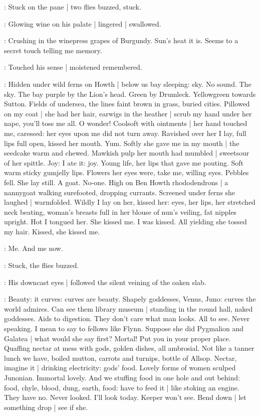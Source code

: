 :
Stuck on the pane |
two flies buzzed,
stuck.

:
Glowing wine on his palate |
lingered |
swallowed.

\BloomInt:
Crushing in the winepress grapes of Burgundy.
Sun's heat it is.
Seems to a secret touch telling me memory.

:
Touched his sense |
moistened remembered.

\BloomInt:
Hidden under wild ferns on Howth |
below us bay sleeping:
sky.
No sound.
The sky.
The bay purple by the Lion's head.
Green by Drumleck.
Yellowgreen towards Sutton.
Fields of undersea,
the lines faint brown in grass,
buried cities.
Pillowed on my coat |
she had her hair,
earwigs in the heather |
scrub my hand under her nape,
you'll toss me all.
O wonder!
Coolsoft with ointments |
her hand touched me,
caressed:
her eyes upon me did not turn away.
Ravished over her I lay,
full lips full open,
kissed her mouth.
Yum.
Softly she gave me in my mouth |
the seedcake warm and chewed.
Mawkish pulp her mouth had mumbled |
sweetsour of her spittle.
Joy:
I ate it:
joy.
Young life,
her lips that gave me pouting.
Soft warm sticky gumjelly lips.
Flowers her eyes were,
take me,
willing eyes.
Pebbles fell.
She lay still.
A goat.
No-one.
High on Ben Howth rhododendrons |
a nannygoat walking surefooted, dropping currants.
Screened under ferns she laughed |
warmfolded.
Wildly I lay on her,
kissed her:
eyes, her lips,
her stretched neck beating,
woman's breasts full in her blouse of nun's veiling,
fat nipples upright.
Hot I tongued her.
She kissed me.
I was kissed.
All yielding she tossed
my hair.
Kissed, she kissed me.

\BloomInt:
Me.
And me now.

:
Stuck,
the flies buzzed.

:
His downcast eyes |
followed the silent veining of the oaken slab.

\BloomInt:
Beauty:
it curves:
curves are beauty.
Shapely goddesses,
Venus, Juno:
curves the world admires.
Can see them library museum |
standing in the round hall,
naked goddesses.
Aids to digestion.
They don't care what man looks.
All to see.
Never speaking.
I mean to say to fellows like Flynn.
Suppose she did Pygmalion and Galatea |
what would she say first?
Mortal!
Put you in your proper place.
Quaffing nectar at mess with gods,
golden dishes,
all ambrosial.
Not like a tanner lunch we have,
boiled mutton,
carrots and turnips,
bottle of Allsop.
Nectar, imagine it |
drinking electricity:
gods' food.
Lovely forms of women sculped Junonian.
Immortal lovely.
And we stuffing food in one hole and out behind:
food, chyle, blood, dung, earth, food:
have to feed it |
like stoking an engine.
They have no.
Never looked.
I'll look today.
Keeper won't see.
Bend down |
let something drop |
see if she.

